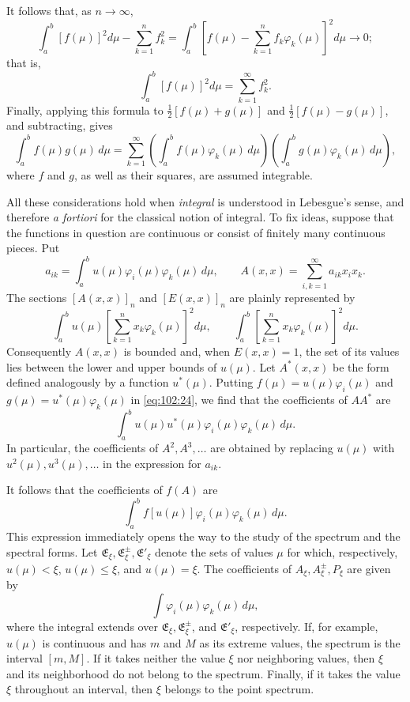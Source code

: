 \documentclass[
  paper=b5,
  fontsize=13pt,
  twoside=true,
  open=any,
  bookmarkpackage=false,
  chapterprefix=true,
  headings=normal
]{scrbook}
\theoremstyle{definition}
\begin{document}
It follows that, as \(n\to\infty\),
\[
  \int_a^b[f(\mu)]^2d\mu-\sum_{k=1}^{n}f_k^2
  =\int_a^b\left[f(\mu)-\sum_{k=1}^{n}f_k\varphi_k(\mu)\right]^2d\mu
  \longrightarrow0;
\]
that is,
\[
  \int_a^b[f(\mu)]^2d\mu=\sum_{k=1}^{\infty}f_k^2.
\]
Finally, applying this formula to
\(\tfrac12[f(\mu)+g(\mu)]\) and \(\tfrac12[f(\mu)-g(\mu)]\), and
subtracting, gives
\begin{equation}
  \int_a^b f(\mu)g(\mu)\,d\mu
  =\sum_{k=1}^{\infty}
  \left(\int_a^b f(\mu)\varphi_k(\mu)\,d\mu\right)
  \left(\int_a^b g(\mu)\varphi_k(\mu)\,d\mu\right),
  \tag{24}\label{eq:102:24}
\end{equation}
where \(f\) and \(g\), as well as their squares, are assumed integrable.

All these considerations hold when \emph{integral} is understood in
Lebesgue's sense, and therefore \emph{a fortiori} for the classical notion of
integral.  To fix ideas, suppose that the functions in question are continuous
or consist of finitely many continuous pieces.  Put
\[
  a_{ik}=\int_a^b u(\mu)\varphi_i(\mu)\varphi_k(\mu)\,d\mu,
  \qquad
  A(x,x)=\sum_{i,k=1}^{\infty}a_{ik}x_ix_k.
\]
The sections \([A(x,x)]_n\) and \([E(x,x)]_n\) are plainly represented by
\[
  \int_a^b u(\mu)\left[\sum_{k=1}^{n}x_k\varphi_k(\mu)\right]^2d\mu,
  \qquad
  \int_a^b\left[\sum_{k=1}^{n}x_k\varphi_k(\mu)\right]^2d\mu.
\]
Consequently \(A(x,x)\) is bounded and, when \(E(x,x)=1\), the set of its
values lies between the lower and upper bounds of \(u(\mu)\).  Let
\(A^*(x,x)\) be the form defined analogously by a function \(u^*(\mu)\).
Putting \(f(\mu)=u(\mu)\varphi_i(\mu)\) and
\(g(\mu)=u^*(\mu)\varphi_k(\mu)\) in \eqref{eq:102:24}, we find that the
coefficients of \(AA^*\) are
\[
  \int_a^b u(\mu)u^*(\mu)\varphi_i(\mu)\varphi_k(\mu)\,d\mu.
\]
In particular, the coefficients of \(A^2,A^3,\ldots\) are obtained by
replacing \(u(\mu)\) with \(u^2(\mu),u^3(\mu),\ldots\) in the expression for
\(a_{ik}\).

It follows that the coefficients of \(f(A)\) are
\[
  \int_a^b f[u(\mu)]\varphi_i(\mu)\varphi_k(\mu)\,d\mu.
\]
This expression immediately opens the way to the study of the spectrum and
the spectral forms.  Let \(\mathfrak E_\xi,\mathfrak E_\xi^{\pm},\mathfrak E'_\xi\)
denote the sets of values \(\mu\) for which, respectively,
\(u(\mu)<\xi\), \(u(\mu)\le\xi\), and \(u(\mu)=\xi\).  The coefficients of
\(A_\xi,A_\xi^{\pm},P_\xi\) are given by
\[
  \int \varphi_i(\mu)\varphi_k(\mu)\,d\mu,
\]
where the integral extends over \(\mathfrak E_\xi,\mathfrak E_\xi^{\pm}\), and
\(\mathfrak E'_\xi\), respectively.  If, for example, \(u(\mu)\) is continuous
and has \(m\) and \(M\) as its extreme values, the spectrum is the interval
\([m,M]\).  If it takes neither the value \(\xi\) nor neighboring values,
then \(\xi\) and its neighborhood do not belong to the spectrum.  Finally, if
it takes the value \(\xi\) throughout an interval, then \(\xi\) belongs to the
point spectrum.
\end{document}
